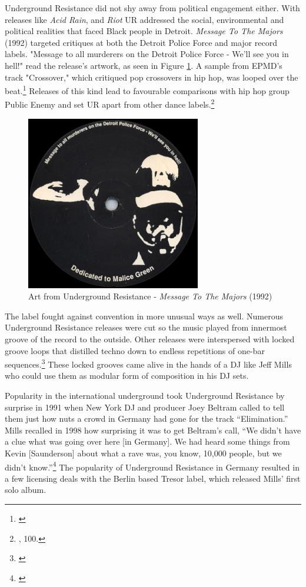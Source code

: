 \documentclass[12pt,twoside]{reedthesis}
\begin{document}
Underground Resistance did not shy away from political engagement either. With releases like \emph{Acid Rain}, and \emph{Riot} UR addressed the social, environmental and political realities that faced Black people in Detroit. \emph{Message To The Majors} (1992) targeted critiques at both the Detroit Police Force and major record labels. "Message to all murderers on the Detroit Police Force - We'll see you in hell!" read the release's artwork, as seen in Figure \ref{fig:messagetothemajors}. A sample from EPMD's track "Crossover," which critiqued pop crossovers in hip hop, was looped over the beat.\footnote{\cite{undergroundresistanceMessageMajors1992a}} Releases of this kind lead to favourable comparisons with hip hop group Public Enemy and set UR apart from other dance labels.\footnote{\cite{sickoTechnoRebelsRenegades2010}, 100.}

\begin{figure}[htbp]
	\begin{centering}
		\includegraphics[width=3in]{./Images/message_to_the_majors}
		\caption{Art from Underground Resistance - \emph{Message To The Majors} (1992)}
		\label{fig:messagetothemajors}
	\end{centering}
\end{figure}

The label fought against convention in more unusual ways as well. Numerous Underground Resistance releases were cut so the music played from innermost groove of the record to the outside. Other releases were interspersed with locked groove loops that distilled techno down to endless repetitions of one-bar sequences.\footnote{\cite{x-102OBXA1992}} These locked grooves came alive in the hands of a DJ like Jeff Mills who could use them as modular form of composition in his DJ sets.

Popularity in the international underground took Underground Resistance by surprise in 1991 when New York DJ and producer Joey Beltram called to tell them just how nuts a crowd in Germany had gone for the track ``Elimination.'' Mills recalled in 1998 how surprising it was to get Beltram's call, ``We didn't have a clue what was going over here [in Germany]. We had heard some things from Kevin [Saunderson] about what a rave was, you know, 10,000 people, but we didn't know.''\footnote{\cite{schmidtJeffMillsLecture1998a}} The popularity of Underground Resistance in Germany resulted in a few licensing deals with the Berlin based Tresor label, which released Mills' first solo album.
\end{document}
